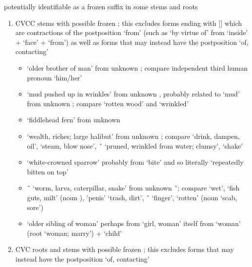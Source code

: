 \begin{morphdesc}[resume*=alphalist]
\begin{enumerate}
		potentially identifiable as a frozen suffix in some stems and roots
		\begin{enumerate}
		\item	CVCC stems with possible frozen ;
			this excludes forms ending with  []
				which are contractions of the postposition  ‘from’
				(such as  ‘by virtue of’
					from  ‘inside’
					+  ‘face’
					+  ‘from’)
			as well as forms that may instead have the postposition  ‘of, contacting’
			\begin{itemize}
			\item	{} ‘older brother of man’
				from unknown ;
				compare independent third human pronoun  ‘him/her’
			\item	{} ‘mud pushed up in wrinkles’
				from unknown ,
				probably related to  ‘mud’
				from unknown ;
				compare  ‘rotten wood’
				and  ‘wrinkled’
			\item	{} ‘fiddlehead fern’
				from unknown 
			\item	{} ‘wealth, riches; large halibut’
				from unknown ;
				compare  ‘drink, dampen, oil’,
				 ‘steam, blow nose’,
				 \~\  ‘pruned, wrinkled from water; clumsy’,
				 ‘shake’
			\item	{} ‘white-crowned sparrow’
				probably from  ‘bite’
				and so literally ‘repeatedly bitten on top’
			\item	{} \~\  ‘worm, larva, caterpillar, snake’
				from unknown  \~\ ;
				compare  ‘wet’,
				 ‘fish guts, milt’ (noun ),
				 ’penis’
				 ‘trash, dirt’,
				 \~\  ‘finger’,
				 ‘rotten’
					(noun  ‘scab, sore’)
			\item	{} ‘older sibling of woman’
				perhaps from  ‘girl, woman’
				itself from  ‘woman’ (root  ‘woman; marry’)
				+  ‘child’
			\end{itemize}
		\item	CVC roots and stems with possible frozen ;
			this excludes forms that may instead have
				the postposition  ‘of, contacting’
			\begin{itemize}

\end{itemize}
\end{enumerate}
\end{enumerate}
\end{morphdesc}
